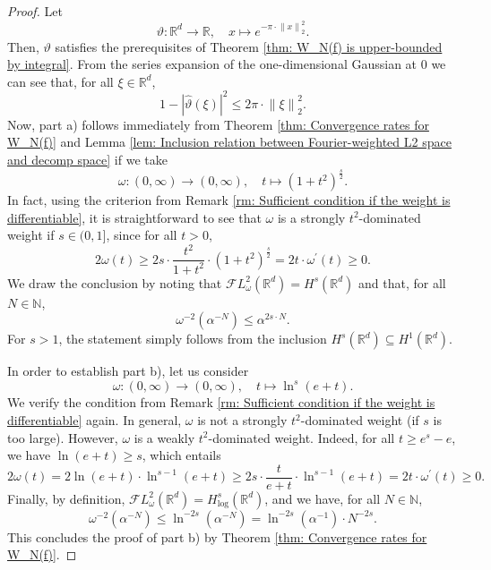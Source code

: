 \documentclass[11pt]{amsart}
\newcommand{\R}{{\mathbb{R}}}
\newcommand{\N}{\mathbb{N}}
\newcommand{\norm}[1]{\ensuremath{\left\lVert\text{}#1\text{}\right\rVert}}
\newenvironment{proof sketch} {\textit{Proof sketch.}}{}
\begin{document}
  \begin{proof}
    Let \[\vartheta: \R^d \to \R, \quad x \mapsto e^{-\pi \cdot \norm{x}_2^2}.\] 
    Then, $\vartheta$ satisfies the prerequisites of Theorem \ref{thm: W_N(f) is upper-bounded by integral}. From the series expansion of the one-dimensional Gaussian at $0$ we can see that, for all $\xi \in \R^d$, 
    \[1-|\widehat{\vartheta}(\xi)|^2\leq 2 \pi \cdot \norm{\xi}_2^2.\]
    Now, part a) follows immediately from Theorem \ref{thm: Convergence rates for W_N(f)} and Lemma \ref{lem: Inclusion relation between Fourier-weighted L2 space and decomp space} if we take 
    \[\omega: (0,\infty)\to (0,\infty), \quad t \mapsto (1+t^2)^{\frac{s}{2}}.\] 
    In fact, using the criterion from Remark \ref{rm: Sufficient condition if the weight is differentiable}, it is straightforward to see that $\omega$ is a strongly $t^2$-dominated weight if $s \in (0,1]$, since for all $t>0$,
    \[2\omega(t)\geq 2s \cdot \frac{t^2}{1+t^2} \cdot (1+t^2)^{\frac{s}{2}} = 2t \cdot \omega^\prime(t)\geq 0.\]  
    We draw the conclusion by noting that $\mathcal{F}L_\omega^2(\R^d)=H^s(\R^d)$ and that, for all $N \in \N$, 
    \[\omega^{-2}(\alpha^{-N})\leq \alpha^{2s\cdot N}.\] 
    For $s>1$, the statement simply follows from the inclusion $H^s(\R^d)\subseteq H^{1}(\R^d)$.
  
    In order to establish part b), 
    let us consider
    \[\omega: (0,\infty)\to (0,\infty), \quad t \mapsto \ln^{s}(e+t).\]
    We verify the condition from Remark \ref{rm: Sufficient condition if the weight is differentiable} again. In general, $\omega$ is not a strongly $t^2$-dominated weight (if $s$ is too large). However, 
    $\omega$ is a weakly $t^2$-dominated weight. Indeed, for all $t\geq e^{s}-e$, we have $\ln(e+t)\geq s$, which entails
    \[2\omega(t)= 2\ln(e+t) \cdot \ln^{s-1}(e+t) \geq  2s \cdot \frac{t}{e+t} \cdot \ln^{s-1}(e+t) = 2t \cdot \omega^\prime(t)\geq 0.\] 
    Finally, by definition, 
    $\mathcal{F}L_\omega^2(\R^d)=H^s_{\log}(\R^d)$, and we have, for all $N \in \N$,
    \[\omega^{-2}(\alpha^{-N})\leq \ln^{-2s}(\alpha^{-N})=\ln^{-2s}(\alpha^{-1}) \cdot N^{-2s}.\]
    This concludes the proof of part b) by Theorem \ref{thm: Convergence rates for W_N(f)}.
  \end{proof}
  
\end{document}
